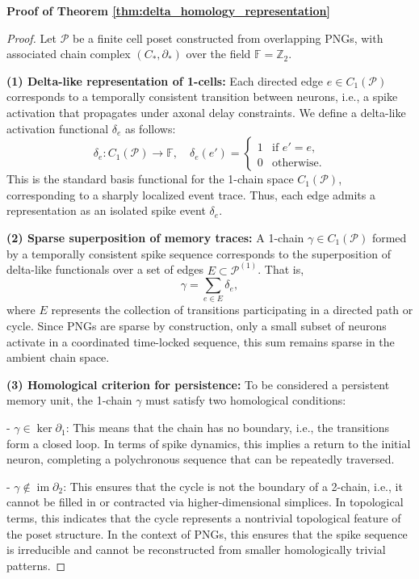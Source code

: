 \documentclass[lettersize,journal]{IEEEtran}
\begin{document}
\noindent\textbf{Proof of Theorem \ref{thm:delta_homology_representation}}

\begin{proof}
Let \( \mathcal{P} \) be a finite cell poset constructed from overlapping PNGs, with associated chain complex \( (C_*, \partial_*) \) over the field \( \mathbb{F} = \mathbb{Z}_2 \).

\textbf{(1) Delta-like representation of 1-cells:}  
Each directed edge \( e \in C_1(\mathcal{P}) \) corresponds to a temporally consistent transition between neurons, i.e., a spike activation that propagates under axonal delay constraints. We define a delta-like activation functional \( \delta_e \) as follows:
\[
\delta_e : C_1(\mathcal{P}) \to \mathbb{F}, \quad \delta_e(e') =
\begin{cases}
1 & \text{if } e' = e, \\
0 & \text{otherwise}.
\end{cases}
\]
This is the standard basis functional for the 1-chain space \( C_1(\mathcal{P}) \), corresponding to a sharply localized event trace. Thus, each edge admits a representation as an isolated spike event \( \delta_e \).

\textbf{(2) Sparse superposition of memory traces:}  
A 1-chain \( \gamma \in C_1(\mathcal{P}) \) formed by a temporally consistent spike sequence corresponds to the superposition of delta-like functionals over a set of edges \( E \subset \mathcal{P}^{(1)} \). That is,
\[
\gamma = \sum_{e \in E} \delta_e,
\]
where \( E \) represents the collection of transitions participating in a directed path or cycle. Since PNGs are sparse by construction, only a small subset of neurons activate in a coordinated time-locked sequence, this sum remains sparse in the ambient chain space.

\textbf{(3) Homological criterion for persistence:}  
To be considered a persistent memory unit, the 1-chain \( \gamma \) must satisfy two homological conditions:

- \( \gamma \in \ker \partial_1 \):  
  This means that the chain has no boundary, i.e., the transitions form a closed loop. In terms of spike dynamics, this implies a return to the initial neuron, completing a polychronous sequence that can be repeatedly traversed.

- \( \gamma \notin \operatorname{im} \partial_2 \):  
  This ensures that the cycle is not the boundary of a 2-chain, i.e., it cannot be filled in or contracted via higher-dimensional simplices. In topological terms, this indicates that the cycle represents a nontrivial topological feature of the poset structure. In the context of PNGs, this ensures that the spike sequence is irreducible and cannot be reconstructed from smaller homologically trivial patterns.


\end{proof}
\end{document}
